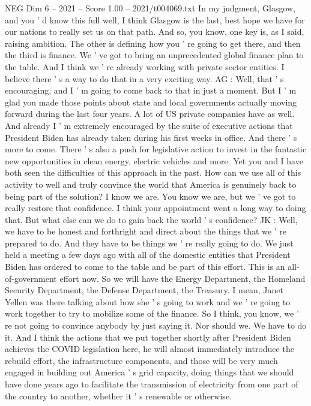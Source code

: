 \begin{textsample}{NEG Dim 6 – 2021 – Score 1.00 – 2021/t004069.txt}
In my judgment, Glasgow, and you ' d know this full well, I think Glasgow is the last, best hope we have for our nations to really set us on that path.
And so, you know, one key is, as I said, raising ambition.
The other is defining how you ' re going to get there, and then the third is finance.
We ' ve got to bring an unprecedented global finance plan to the table.
And I think we ' re already working with private sector entities.
I believe there ' s a way to do that in a very exciting way.
AG : Well, that ' s encouraging, and I ' m going to come back to that in just a moment.
But I ' m glad you made those points about state and local governments actually moving forward during the last four years.
A lot of US private companies have as well.
And already I ' m extremely encouraged by the suite of executive actions that President Biden has already taken during his first weeks in office.
And there ' s more to come.
There ' s also a push for legislative action to invest in the fantastic new opportunities in clean energy, electric vehicles and more.
Yet you and I have both seen the difficulties of this approach in the past.
How can we use all of this activity to well and truly convince the world that America is genuinely back to being part of the solution?
I know we are.
You know we are, but we ' ve got to really restore that confidence.
I think your appointment went a long way to doing that.
But what else can we do to gain back the world ' s confidence?
JK : Well, we have to be honest and forthright and direct about the things that we ' re prepared to do.
And they have to be things we ' re really going to do.
We just held a meeting a few days ago with all of the domestic entities that President Biden has ordered to come to the table and be part of this effort.
This is an all-of-government effort now.
So we will have the Energy Department, the Homeland Security Department, the Defense Department, the Treasury.
I mean, Janet Yellen was there talking about how she ' s going to work and we ' re going to work together to try to mobilize some of the finance.
So I think, you know, we ' re not going to convince anybody by just saying it.
Nor should we.
We have to do it.
And I think the actions that we put together shortly after President Biden achieves the COVID legislation here, he will almost immediately introduce the rebuild effort, the infrastructure components, and those will be very much engaged in building out America ' s grid capacity, doing things that we should have done years ago to facilitate the transmission of electricity from one part of the country to another, whether it ' s renewable or otherwise.

\end{textsample}
